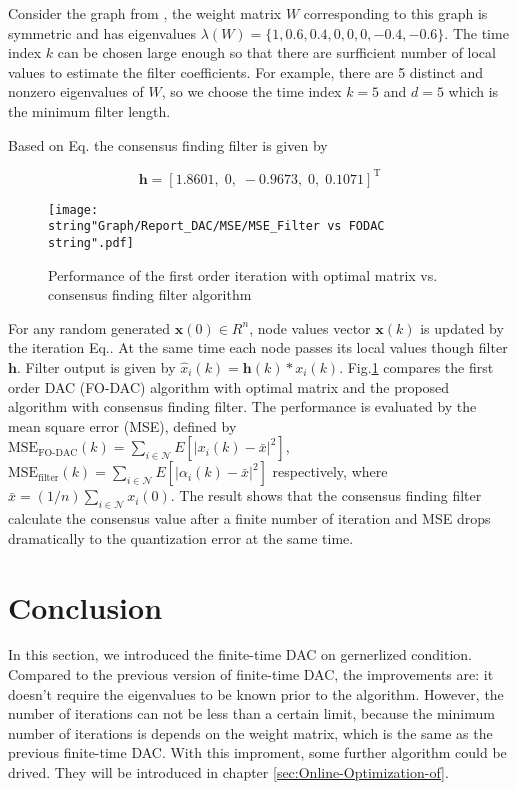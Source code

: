 Consider the graph from \cite{Xiao2004}, the weight matrix \textbf{$W$}
corresponding to this graph is symmetric and has eigenvalues $\lambda(W)=\{1,0.6,0.4,0,0,0,-0.4,-0.6\}$.
The time index $k$ can be chosen large enough so that there are surfficient
number of local values to estimate the filter coefficients.  For example,
there are 5 distinct and nonzero eigenvalues of \textbf{$W$}, so
we choose the time index $k=5$ and $d=5$ which is the minimum filter
length.

 Based on Eq.  the consensus
finding filter is given by

\[
\mathbf{h}=\left[1.8601,\;0,\;-0.9673,\;0,\;0.1071\right]^{\mathrm{T}}
\]


\begin{figure}
\hfill{}\texttt{[image: \\string"Graph/Report\_DAC/MSE/MSE\_Filter vs FODAC\\string".pdf]}\hfill{}

\caption{\label{cap:perform. Consensus Filter}Performance of the first order
iteration with optimal matrix vs. consensus finding filter algorithm}
\end{figure}


For any random generated $\mathbf{x}(0)\in R^{n}$, node values vector
$\mathbf{x}(k)$ is updated by the iteration Eq..
At the same time each node passes its local values though filter $\mathbf{h}$.
Filter output is given by $\hat{x}_{i}(k)=\mathbf{h}(k)*x_{i}(k)$.
Fig.\ref{cap:perform. Consensus Filter} compares the first order
DAC (FO-DAC) algorithm with optimal matrix and the proposed algorithm
with consensus finding filter. The performance is evaluated by the
mean square error (MSE), defined by $\mbox{MSE}_{\mbox{FO-DAC}}(k)=\sum_{i\in\mathcal{N}}E[\left|x_{i}(k)-\bar{x}\right|^{2}]$,
$\mbox{MSE}_{\mbox{filter}}(k)=\sum_{i\in\mathcal{N}}E[\left|\alpha_{i}(k)-\bar{x}\right|^{2}]$
respectively, where $\bar{x}=(1/n)\sum_{i\in\mathcal{N}}x_{i}(0)$.
The result shows that the consensus finding filter calculate the consensus
value after a finite number of iteration and MSE drops dramatically
to the quantization error at the same time. 


\section{Conclusion}

In this section, we introduced the finite-time DAC on gernerlized
condition. Compared to the previous version of finite-time DAC, the
improvements are: it doesn't require the eigenvalues to be known prior
to the algorithm. However, the number of iterations can not be less
than a certain limit, because the minimum number of iterations is
depends on the weight matrix, which is the same as the previous finite-time
DAC. With this improment, some further algorithm could be drived.
They will be introduced in chapter \ref{sec:Online-Optimization-of}.
